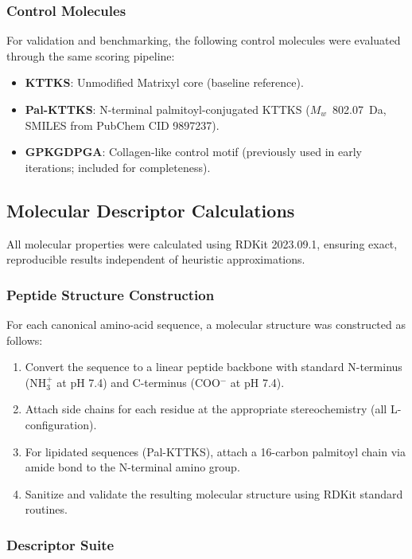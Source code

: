 \documentclass[11pt,letterpaper]{article}
\begin{document}
\subsubsection{Control Molecules}

For validation and benchmarking, the following control molecules were evaluated through the same scoring pipeline:
\begin{itemize}
  \item \textbf{KTTKS}: Unmodified Matrixyl core (baseline reference).
  \item \textbf{Pal-KTTKS}: N-terminal palmitoyl-conjugated KTTKS ($M_w$~802.07~Da, SMILES from PubChem CID 9897237).
  \item \textbf{GPKGDPGA}: Collagen-like control motif (previously used in early iterations; included for completeness).
\end{itemize}

\subsection{Molecular Descriptor Calculations}

All molecular properties were calculated using RDKit 2023.09.1, ensuring exact, reproducible results independent of heuristic approximations.

\subsubsection{Peptide Structure Construction}

For each canonical amino-acid sequence, a molecular structure was constructed as follows:
\begin{enumerate}
  \item Convert the sequence to a linear peptide backbone with standard N-terminus (NH$_3^+$ at pH 7.4) and C-terminus (COO$^-$ at pH 7.4).
  \item Attach side chains for each residue at the appropriate stereochemistry (all L-configuration).
  \item For lipidated sequences (Pal-KTTKS), attach a 16-carbon palmitoyl chain via amide bond to the N-terminal amino group.
  \item Sanitize and validate the resulting molecular structure using RDKit standard routines.
\end{enumerate}

\subsubsection{Descriptor Suite}
\end{document}
